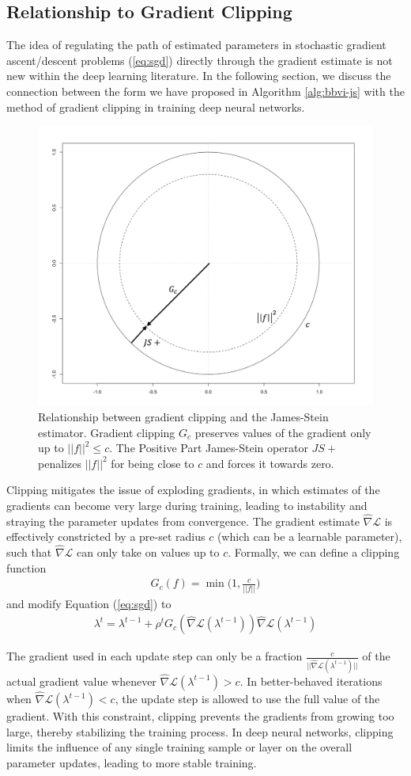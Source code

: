 \documentclass{article}
\begin{document}
\subsection{Relationship to Gradient Clipping}
\label{sec:gradclip}

The idea of regulating the path of estimated parameters in stochastic gradient ascent/descent problems (\ref{eq:sgd}) directly through the gradient estimate is not new within the deep learning literature. In the following section, we discuss the connection between the form we have proposed in Algorithm \ref{alg:bbvi-js} with the method of gradient clipping in training deep neural networks.

\begin{figure}[ht]
  \centering
  \includegraphics[width=0.4 \linewidth]{clip.png}
  \caption{\label{fig:clip} Relationship between gradient clipping and the James-Stein estimator. Gradient clipping $G_c$ preserves values of the gradient only up to $|| f ||^2 \leq c$. The Positive Part James-Stein operator $JS+$ penalizes $||f||^2$ for being close to $c$ and forces it towards zero.}
\end{figure}


Clipping mitigates the issue of exploding gradients, in which estimates of the gradients can become very large during training, leading to instability and straying the parameter updates from convergence. The gradient estimate $\hat\nabla\mathcal{L}$ is effectively constricted by a pre-set radius $c$ (which can be a learnable parameter), such that $\hat\nabla\mathcal{L}$ can only take on values up to $c$. Formally, we can define a clipping function
\begin{align*}
    G_c(f) = \min\bigg(1, \frac{c}{||f||} \bigg)
\end{align*}
and modify Equation (\ref{eq:sgd}) to
\begin{align*}
    \lambda^t = \lambda^{t-1} + \rho^t G_c(\hat\nabla\mathcal{L}(\lambda^{t-1})) \hat\nabla\mathcal{L}(\lambda^{t-1})
\end{align*}

The gradient used in each update step can only be a fraction $\frac{c}{|| \hat\nabla\mathcal{L}(\lambda^{t-1}) ||}$ of the actual gradient value whenever $\hat\nabla\mathcal{L}(\lambda^{t-1}) > c$. In better-behaved iterations when $\hat\nabla\mathcal{L}(\lambda^{t-1}) < c$, the update step is allowed to use the full value of the gradient. With this constraint, clipping prevents the gradients from growing too large, thereby stabilizing the training process. In deep neural networks, clipping limits the influence of any single training sample or layer on the overall parameter updates, leading to more stable training.
\end{document}
